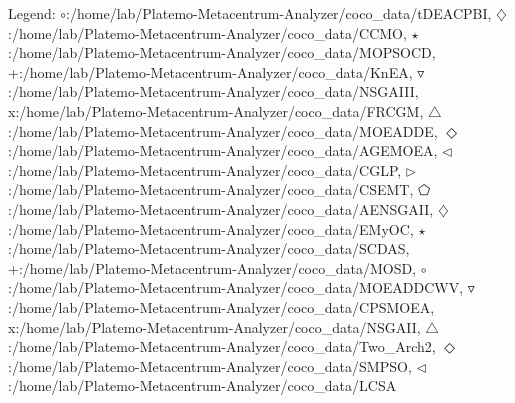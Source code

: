 Legend: {\color{CornflowerBlue}$\circ$}:/home/lab/Platemo-Metacentrum-Analyzer/coco\_data/tDEACPBI, {{}$\diamondsuit$}:/home/lab/Platemo-Metacentrum-Analyzer/coco\_data/CCMO, {\color{Green}$\star$}:/home/lab/Platemo-Metacentrum-Analyzer/coco\_data/MOPSOCD, {\color{red}+}:/home/lab/Platemo-Metacentrum-Analyzer/coco\_data/KnEA, {\color{brown}$\triangledown$}:/home/lab/Platemo-Metacentrum-Analyzer/coco\_data/NSGAIII, {{}x}:/home/lab/Platemo-Metacentrum-Analyzer/coco\_data/FRCGM, {{}$\triangle$}:/home/lab/Platemo-Metacentrum-Analyzer/coco\_data/MOEADDE, {{}$\Diamond$}:/home/lab/Platemo-Metacentrum-Analyzer/coco\_data/AGEMOEA, {{}$\triangleleft$}:/home/lab/Platemo-Metacentrum-Analyzer/coco\_data/CGLP, {{}$\triangleright$}:/home/lab/Platemo-Metacentrum-Analyzer/coco\_data/CSEMT, {{}$\pentagon$}:/home/lab/Platemo-Metacentrum-Analyzer/coco\_data/AENSGAII, {{}$\diamondsuit$}:/home/lab/Platemo-Metacentrum-Analyzer/coco\_data/EMyOC, {{}$\star$}:/home/lab/Platemo-Metacentrum-Analyzer/coco\_data/SCDAS, {{}+}:/home/lab/Platemo-Metacentrum-Analyzer/coco\_data/MOSD, {{}$\circ$}:/home/lab/Platemo-Metacentrum-Analyzer/coco\_data/MOEADDCWV, {{}$\triangledown$}:/home/lab/Platemo-Metacentrum-Analyzer/coco\_data/CPSMOEA, {{}x}:/home/lab/Platemo-Metacentrum-Analyzer/coco\_data/NSGAII, {{}$\triangle$}:/home/lab/Platemo-Metacentrum-Analyzer/coco\_data/Two\_Arch2, {{}$\Diamond$}:/home/lab/Platemo-Metacentrum-Analyzer/coco\_data/SMPSO, {{}$\triangleleft$}:/home/lab/Platemo-Metacentrum-Analyzer/coco\_data/LCSA